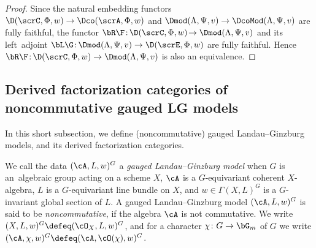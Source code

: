 \begin{thm}
\begin{proof}
Since the natural embedding functors $\D(\scrC,\Phi,w)\to \Dco(\scrA,\Phi,w)$ and $\Dmod(\Lambda,\Psi,v)\to \DcoMod(\Lambda,\Psi,v)$ are fully faithful, the functor $\bR \F\colon\!\D(\scrC,\Phi,w)\!\to \Dmod(\Lambda,\Psi,v)$ and its left~adjo\-int $\bL \G\colon \! \Dmod(\Lambda,\Psi,v)\to \D(\scrE,\Phi,w)$ are fully faithful. Hence $\bR \F\colon\!\D(\scrC,\Phi,w)\to
\Dmod(\Lambda,\Psi,v)$ is also an equivalence.
\end{proof}
\end{thm}

\subsection{Derived factorization categories of noncommutative gauged LG models}

In this short subsection, we define (noncommutative) gauged Landau--Ginzburg models, and its derived factorization categories.

\begin{dfn}
We call the data $(\cA,L,w)^G$ a {\it gauged Landau--Ginzburg model} when $G$ is an~alge\-braic group acting on a scheme $X$, $\cA$ is a $G$-equivariant coherent $X$-algebra, $L$ is a $G$-equivariant line bundle on $X$, and $w\in \Gamma(X,L)^G$ is a $G$-invariant global section of $L$. A gauged Landau--Ginzburg model $(\cA,L,w)^G$ is said to be {\it noncommutative}, if the algebra $\cA$ is not commutative. We write $(X,L,w)^G\defeq(\cO_X,L,w)^G$, and for a character $\chi\colon G\to \bG_m$ of $G$ we write $(\cA,\chi,w)^G\defeq(\cA,\cO(\chi),w)^G$.
\end{dfn}

